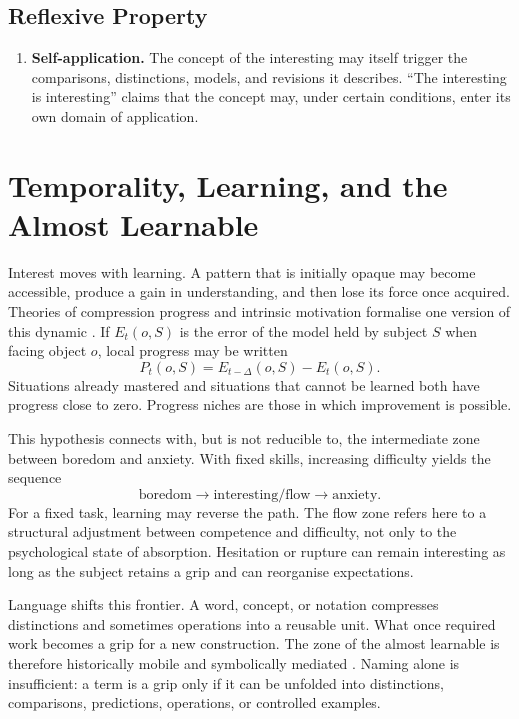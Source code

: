 \documentclass[11pt,a4paper]{article}
\begin{document}
\subsection{Reflexive Property}

\begin{enumerate}[resume]
  \item \textbf{Self-application.} The concept of the interesting may itself
        trigger the comparisons, distinctions, models, and revisions it
        describes. ``The interesting is interesting'' claims that the concept
        may, under certain conditions, enter its own domain of application.
\end{enumerate}

\section{Temporality, Learning, and the Almost Learnable}

Interest moves with learning. A pattern that is initially opaque may become
accessible, produce a gain in understanding, and then lose its force once
acquired. Theories of compression progress and intrinsic motivation formalise
one version of this dynamic
\parencite{schmidhuber1997interesting,schmidhuber2009compression,oudeyer2007intrinsic,oudeyer2007typology}.
If \(E_t(o,S)\) is the error of the model held by subject \(S\) when facing
object \(o\), local progress may be written
\[
  P_t(o,S)=E_{t-\Delta}(o,S)-E_t(o,S).
\]
Situations already mastered and situations that cannot be learned both have
progress close to zero. Progress niches are those in which improvement is
possible.

This hypothesis connects with, but is not reducible to, the intermediate zone
between boredom and anxiety. With fixed skills, increasing difficulty yields
the sequence
\[
  \text{boredom}\longrightarrow\text{interesting/flow}
  \longrightarrow\text{anxiety}.
\]
For a fixed task, learning may reverse the path. The flow zone refers here to a
structural adjustment between competence and difficulty, not only to the
psychological state of absorption. Hesitation or rupture can remain interesting
as long as the subject retains a grip and can reorganise expectations.

Language shifts this frontier. A word, concept, or notation compresses
distinctions and sometimes operations into a reusable unit. What once required
work becomes a grip for a new construction. The zone of the almost learnable is
therefore historically mobile and symbolically mediated
\parencite{vygotsky1978mind,lenat1991thresholds,lenat2008turtle,koestler1989act,steels2005coordinating,steels2015talkingheads}.
Naming alone is insufficient: a term is a grip only if it can be unfolded into
distinctions, comparisons, predictions, operations, or controlled examples.
\end{document}
